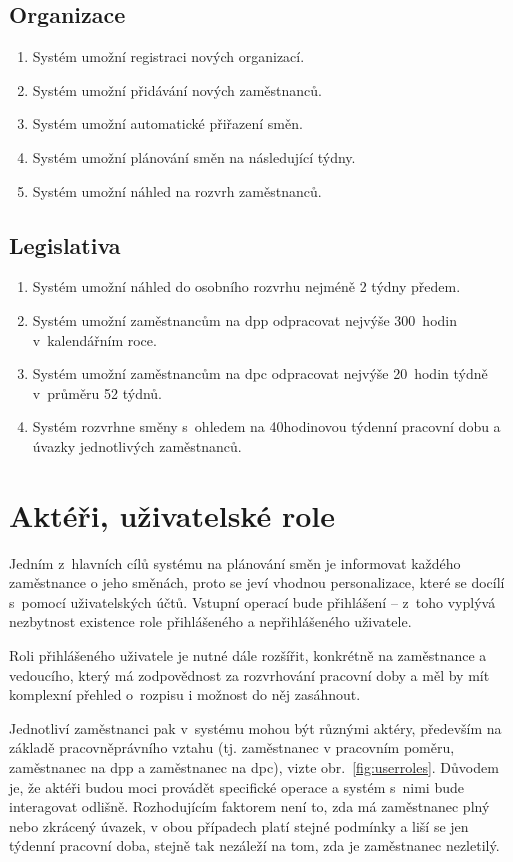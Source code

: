 \documentclass[a4paper,11pt,openany,twoside]{book}
\begin{document}
\subsection*{Organizace}
\begin{enumerate}[label=\textbf{O\arabic*.}]
	\item Systém umožní registraci nových organizací.
	\item Systém umožní přidávání nových zaměstnanců.
	\item Systém umožní automatické přiřazení směn.
	\item Systém umožní plánování směn na následující týdny.
	\item Systém umožní náhled na rozvrh zaměstnanců.
\end{enumerate}

\subsection*{Legislativa}
\begin{enumerate}[label=\textbf{L\arabic*.}]
		\item Systém umožní náhled do osobního rozvrhu nejméně 2 týdny předem.
		\item Systém umožní zaměstnancům na \acs{dpp} odpracovat nejvýše 300~hodin v~kalendářním roce.
		\item Systém umožní zaměstnancům na \acs{dpc} odpracovat nejvýše 20~hodin týdně v~průměru 52 týdnů.
		\item Systém rozvrhne směny s~ohledem na 40hodinovou týdenní pracovní dobu a úvazky jednotlivých zaměstnanců.
\end{enumerate}

\section{Aktéři, uživatelské role}
Jedním z~hlavních cílů systému na plánování směn je informovat každého zaměstnance o jeho směnách, proto se jeví vhodnou personalizace, které se docílí s~pomocí uživatelských účtů. Vstupní operací bude přihlášení -- z~toho vyplývá nezbytnost existence role přihlášeného a nepřihlášeného uživatele.

Roli přihlášeného uživatele je nutné dále rozšířit, konkrétně na zaměstnance a vedoucího, který má zodpovědnost za rozvrhování pracovní doby a měl by mít komplexní přehled o~rozpisu i možnost do něj zasáhnout.

Jednotliví zaměstnanci pak v~systému mohou být různými aktéry, především na základě pracovněprávního vztahu (tj. zaměstnanec v pracovním poměru, zaměstnanec na \acs{dpp} a zaměstnanec na \acs{dpc}), vizte obr.~\ref{fig:userroles}. Důvodem je, že aktéři budou moci provádět specifické operace a systém s~nimi bude interagovat odlišně. Rozhodujícím faktorem není to, zda má zaměstnanec plný nebo zkrácený úvazek, v obou případech platí stejné podmínky a liší se jen týdenní pracovní doba, stejně tak nezáleží na tom, zda je zaměstnanec nezletilý.
\end{document}
